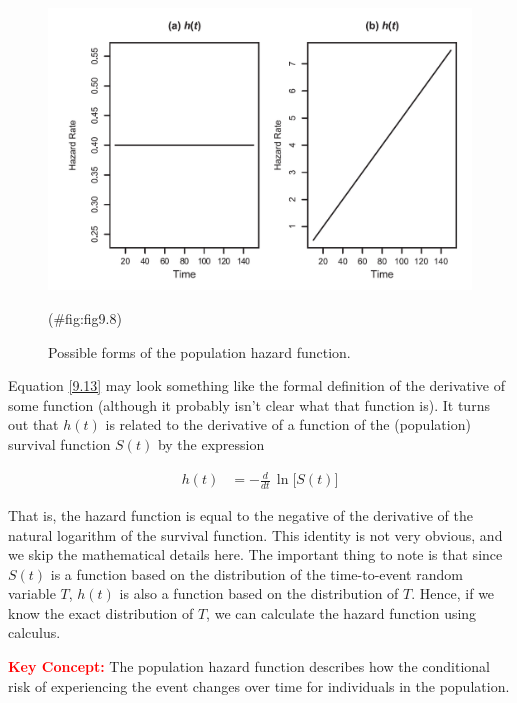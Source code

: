 \documentclass[
]{report}
\begin{document}
\begin{figure}

{\centering \includegraphics[width=1\linewidth]{docs/Fig9_8} 

}

\caption{Possible forms of the population hazard function.}(\#fig:fig9.8)
\end{figure}

Equation \ref{9.13} may look something like the formal definition of the derivative of some function (although it probably isn't clear what that function is). It turns out that \(h(t)\) is related to the derivative of a function of the (population) survival function \(S(t)\) by the expression

\begin{align}\label{9.14}
h(t) &= -\frac{d}{dt}\,\ln\bigl[S(t)\bigr]
\tag{9.14}
\end{align}

That is, the hazard function is equal to the negative of the derivative of the natural logarithm of the survival function. This identity is not very obvious, and we skip the mathematical details here. The important thing to note is that since \(S(t)\) is a function based on the distribution of the time-to-event random variable \(T\), \(h(t)\) is also a function based on the distribution of \(T\). Hence, if we know the exact distribution of \(T\), we can calculate the hazard function using calculus.

\Large

\textbf{\textcolor{red}{Key Concept:}}
\color{red}
The population hazard function describes how the conditional risk of experiencing the event changes over time for individuals in the population.\\
\color{black}
\normalsize
\end{document}
